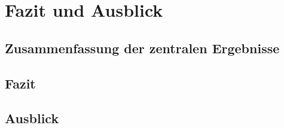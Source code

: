 \chapter{Fazit und Ausblick}
\label{sec:FazitUndAusblick}

\section{Zusammenfassung der zentralen Ergebnisse}
\label{sec:ZusammenfassungErgebnisse}

\section{Fazit}
\label{sec:Fazit}

\section{Ausblick}
\label{sec:Ausblick}
